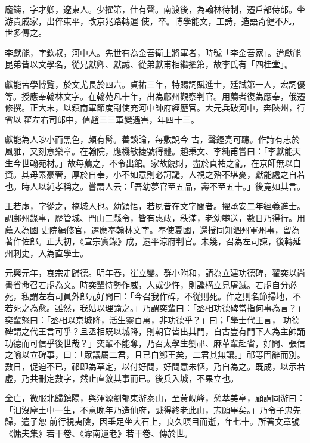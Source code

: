 \begin{pinyinscope}
 龐鑄，字才卿，遼東人。少擢第，仕有聲。南渡後，為翰林待制，遷戶部侍郎。坐游貴戚家，出倅東平，改京兆路轉運
 使，卒。博學能文，工詩，造語奇健不凡，世多傳之。



 李獻能，字欽叔，河中人。先世有為金吾衛上將軍者，時號「李金吾家」。迨獻能昆弟皆以文學名，從兄獻卿、獻誠、從弟獻甫相繼擢第，故李氏有「四桂堂」。



 獻能苦學博覽，於文尤長於四六。貞祐三年，特賜詞賦進士，廷試第一人，宏詞優等。授應奉翰林文字。在翰苑凡十年，出為鄜州觀察判官。用薦者復為應奉，俄遷修撰。正大末，以鎮南軍節度副使充河中帥府經歷官。大元兵破河中，奔陜州，行省以雚左右司郎中，值趙三三軍變遇害，年四十三。



 獻能為人眇小而黑色，頗有髯。善談論，每敷說今
 古，聲鏗亮可聽。作詩有志於風雅，又刻意樂章。在翰院，應機敏捷號得體。趙秉文、李純甫嘗曰：「李獻能天生今世翰苑材。」故每薦之，不令出館。家故饒財，盡於貞祐之亂，在京師無以自資。其母素豪奢，厚於自奉，小不如意則必訶譴，人視之殆不堪憂，獻能處之自若也。時人以純孝稱之。嘗謂人云：「吾幼夢官至五品，壽不至五十。」後竟如其言。



 王若虛，字從之，槁城人也。幼穎悟，若夙昔在文字間者。擢承安二年經義進士。調鄜州錄事，歷管城、門山二縣令，皆有惠政，秩滿，老幼攀送，數日乃得行。用薦入為國
 史院編修官，遷應奉翰林文字。奉使夏國，還授同知泗州軍州事，留為著作佐郎。正大初，《宣宗實錄》成，遷平涼府判官。未幾，召為左司諫，後轉延州刺史，入為直學士。



 元興元年，哀宗走歸德。明年春，崔立變。群小附和，請為立建功德碑，翟奕以尚書省命召若虛為文。時奕輩恃勢作威，人或少忤，則讒構立見屠滅。若虛自分必死，私謂左右司員外郎元好問曰：「今召我作碑，不從則死。作之則名節掃地，不若死之為愈。雖然，我姑以理諭之。」乃謂奕輩曰：「丞相功德碑當指何事為言？」奕輩怒曰：「丞相以京城降，活生靈百萬，非功德乎？」曰；「學士代王言，
 功德碑謂之代王言可乎？且丞相既以城降，則朝官皆出其門，自古豈有門下人為主帥誦功德而可信乎後世哉？」奕輩不能奪，乃召太學生劉祁、麻革輩赴省，好問、張信之喻以立碑事，曰：「眾議屬二君，且已白鄭王矣，二君其無讓。」祁等固辭而別。數日，促迫不已，祁即為草定，以付好問，好問意未愜，乃自為之。既成，以示若虛，乃共刪定數字，然止直敘其事而已。後兵入城，不果立也。



 金亡，微服北歸鎮陽，與渾源劉郁東游泰山，至黃峴峰，憩萃美亭，顧謂同游曰：「汩沒塵土中一生，不意晚年乃造仙府，誠得終老此山，志願畢矣。」乃令子忠先歸，遣子恕
 前行視夷險，因垂足坐大石上，良久瞑目而逝，年七十。所著文章號《慵夫集》若干卷、《滹南遺老》若干卷、傳於世。




\end{pinyinscope}
